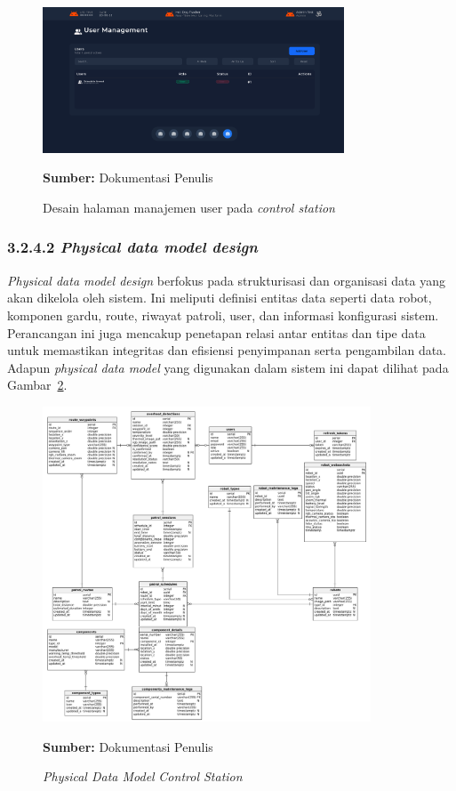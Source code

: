 \begin{figure}[H]
  \centering
  \includegraphics[width=0.8\textwidth]{gambar/bab3/user-ui.png}
  \caption{Desain halaman manajemen user pada \emph{control station}}
  \label{fig:control-station-robot-user}
  \footnotesize{\textbf{Sumber:} Dokumentasi Penulis}
\end{figure}






\subsubsection{3.2.4.2 \emph{Physical data model design}}
\emph{Physical data model design} berfokus pada strukturisasi dan organisasi data yang akan dikelola oleh sistem. Ini meliputi definisi entitas data seperti data robot, komponen gardu, route, riwayat patroli, user, dan informasi konfigurasi sistem. Perancangan ini juga mencakup penetapan relasi antar entitas dan tipe data untuk memastikan integritas dan efisiensi penyimpanan serta pengambilan data. Adapun \emph{physical data model} yang digunakan dalam sistem ini dapat dilihat pada Gambar~\ref{fig:physical-data-model}.

\begin{figure}[H]
  \centering
  \includegraphics[width=0.87\textwidth]{gambar/bab3/pdm.png}
  \caption{\emph{Physical Data Model} \emph{Control Station}}
  \label{fig:physical-data-model}
  \footnotesize{\textbf{Sumber:} Dokumentasi Penulis}
\end{figure}

